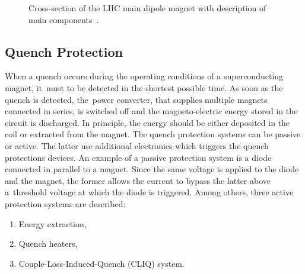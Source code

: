 \begin{figure}[H]
    \centering
    \caption{Cross-section of the LHC main dipole magnet with description of main components~\cite{lhc_main_dipole_cross_section}.}
    \label{fig:cross_section_lhc_main_dipole}
\end{figure}

\subsection{Quench Protection}

When a quench occurs during the operating conditions of a superconducting magnet, it~must to be detected in the shortest possible time. As soon as the quench is detected, the~power converter, that supplies multiple magnets connected in series, is switched off and the magneto-electric energy stored in the circuit is discharged. In principle, the energy should be either deposited in the coil or extracted from the magnet. The quench protection systems can be passive or active. The latter use additional electronics which triggers the quench protections devices. An example of a passive protection system is a diode connected in parallel to a magnet. Since the same voltage is applied to the diode and the magnet, the former allows the current to bypass the latter above a~threshold voltage at which the diode is triggered. Among others, three active protection systems are described: 

\begin{enumerate}
	\item Energy extraction,
	\item Quench heaters,
	\item Couple-Loss-Induced-Quench (CLIQ) system. 
\end{enumerate}

